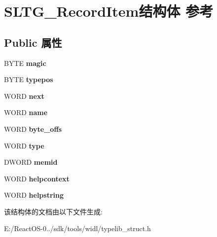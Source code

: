 \hypertarget{struct_s_l_t_g___record_item}{}\section{S\+L\+T\+G\+\_\+\+Record\+Item结构体 参考}
\label{struct_s_l_t_g___record_item}
\subsection*{Public 属性}
\begin{DoxyCompactItemize}
\item 
\mbox{\label{struct_s_l_t_g___record_item_ad726b07b178c3b352caa969c1a312fd3}} 
B\+Y\+TE {\bfseries magic}
\item 
\mbox{\label{struct_s_l_t_g___record_item_a6c23d2e9e53cdbbfe3b457cecbebd5ef}} 
B\+Y\+TE {\bfseries typepos}
\item 
\mbox{\label{struct_s_l_t_g___record_item_a9e21ed6981fb02fdc4bbe99c54fe0dd8}} 
W\+O\+RD {\bfseries next}
\item 
\mbox{\label{struct_s_l_t_g___record_item_aeb5354704591ffd2955f21ad23b4b78c}} 
W\+O\+RD {\bfseries name}
\item 
\mbox{\label{struct_s_l_t_g___record_item_a88b1dea55c28e45e00316612d819c89a}} 
W\+O\+RD {\bfseries byte\+\_\+offs}
\item 
\mbox{\label{struct_s_l_t_g___record_item_aaf1322a5d5cf3dd1b67269861f6a5613}} 
W\+O\+RD {\bfseries type}
\item 
\mbox{\label{struct_s_l_t_g___record_item_ab02530718811bc9303a7e34045395473}} 
D\+W\+O\+RD {\bfseries memid}
\item 
\mbox{\label{struct_s_l_t_g___record_item_a08287e0816aa4934f03100becb97d896}} 
W\+O\+RD {\bfseries helpcontext}
\item 
\mbox{\label{struct_s_l_t_g___record_item_a1c7f7588607348a7b2d006118d6fd340}} 
W\+O\+RD {\bfseries helpstring}
\end{DoxyCompactItemize}


该结构体的文档由以下文件生成\+:\begin{DoxyCompactItemize}
\item 
E\+:/\+React\+O\+S-\/0../sdk/tools/widl/typelib\+\_\+struct.\+h\end{DoxyCompactItemize}
